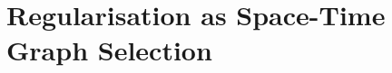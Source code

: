 \documentclass[12pt,a4paper]{article} %
\begin{document}


\newpage
\section{Regularisation as Space-Time Graph Selection}
\end{document}
